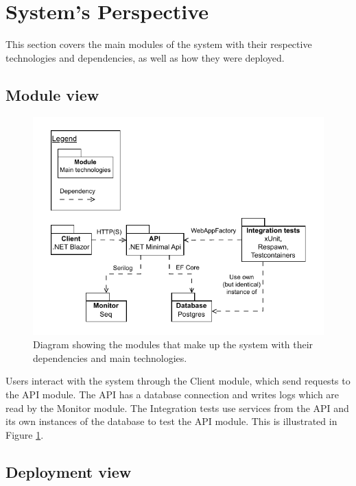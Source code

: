 \section{System's Perspective}
\label{ch:sys_persp} %

This section covers the main modules of the system with their  
respective technologies and dependencies, as well as how they
were deployed.

\subsection{Module view}

\begin{figure}[H]
    \centering
    \includegraphics[width=\linewidth]{images/modules.drawio.pdf}
    \caption{Diagram showing the modules that make up the system with
    their dependencies and main technologies.}
    \label{fig:modules}
\end{figure}

Users interact with the system through the Client module,
which send requests to the API module. The API has a database 
connection and writes logs which are read by the Monitor module.
The Integration tests use services from the API and its own instances
of the database to test the API module.
This is illustrated in Figure \ref{fig:modules}.

\subsection{Deployment view}

